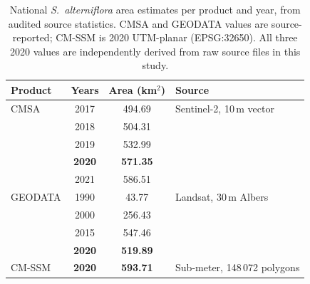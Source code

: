 \begin{table}[htpb]
\centering
\caption{\label{tab:area_full}National \textit{S.~alterniflora} area estimates
  per product and year, from audited source statistics. CMSA and GEODATA values
  are source-reported; CM-SSM is 2020 UTM-planar (EPSG:32650). All three 2020
  values are independently derived from raw source files in this study.}
\begin{tabular}{l c c l}
\toprule
Product & Years & Area (km$^2$) & Source \\
\midrule
CMSA & 2017 & 494.69 & Sentinel-2, 10\,m vector \\
     & 2018 & 504.31 & \\
     & 2019 & 532.99 & \\
     & \textbf{2020} & \textbf{571.35} & \\
     & 2021 & 586.51 & \\
\midrule
GEODATA & 1990 & 43.77 & Landsat, 30\,m Albers \\
        & 2000 & 256.43 & \\
        & 2015 & 547.46 & \\
        & \textbf{2020} & \textbf{519.89} & \\
\midrule
CM-SSM & \textbf{2020} & \textbf{593.71} & Sub-meter, 148\,072 polygons \\
\bottomrule
\end{tabular}
\end{table}
